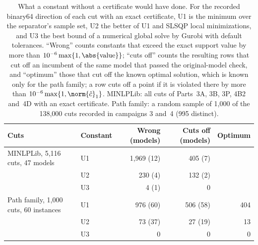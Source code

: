 \begin{table}[t]
\centering\footnotesize
\caption{What a constant without a certificate would have done. For the
recorded binary64 direction of each cut with an exact certificate, U1 is the
minimum over the separator's sample set, U2 the better of U1 and SLSQP local
minimizations, and U3 the best bound of a numerical global solve by Gurobi with
default tolerances. ``Wrong'' counts constants that exceed the exact support
value by more than $10^{-6}\max\{1,\abs{\text{value}}\}$; ``cuts off'' counts
the resulting rows that cut off an incumbent of the same model that passed the
original-model check, and ``optimum'' those that cut off the known optimal
solution, which is known only for the path family; a row cuts off a point if
it is violated there by more than $10^{-6}\max\{1,\norm{\hat c}_1\}$. MINLPLib:
all cuts of Parts~3A, 3B, 3P, 4B2 and~4D with an exact certificate. Path family: a random
sample of 1{,}000 of the 138{,}000 cuts recorded in campaigns 3 and~4 (995
distinct).}\label{tab:ablation}
\begin{tabular}{@{}llrrr@{}}
\toprule
Cuts & Constant & Wrong (models) & Cuts off (models) & Optimum\\
\midrule
MINLPLib, 5{,}116 cuts, 47 models & U1 & 1{,}969 (12) & 405 (7) & \\
 & U2 & 230 (4) & 132 (2) & \\
 & U3 & 4 (1) & 0 & \\
\midrule
Path family, 1{,}000 cuts, 60 instances & U1 & 976 (60) & 506 (58) & 404\\
 & U2 & 73 (37) & 27 (19) & 13\\
 & U3 & 0 & 0 & 0\\
\bottomrule
\end{tabular}
\end{table}

